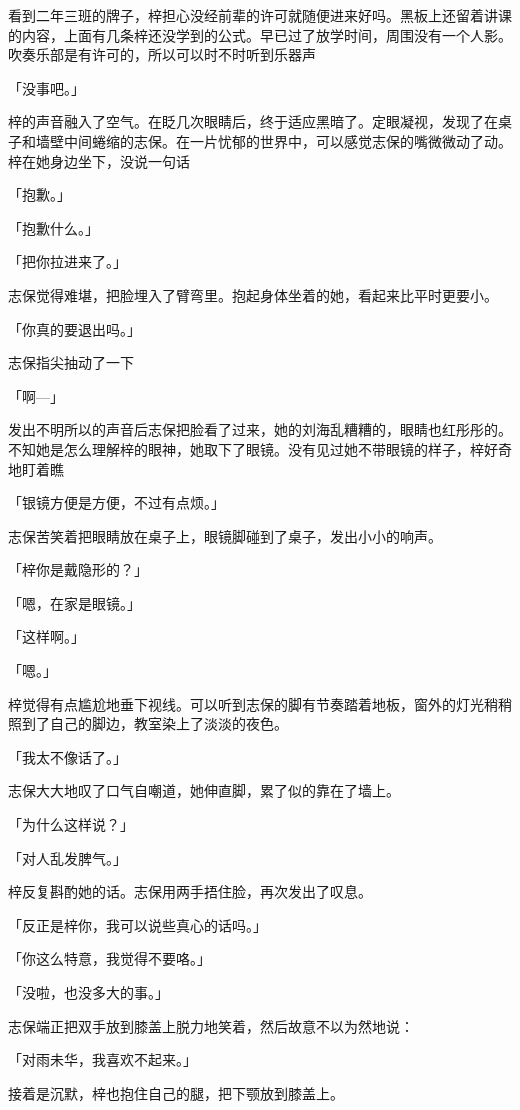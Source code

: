 \documentclass[UTF8]{ctexart}
\begin{document}
    看到二年三班的牌子，梓担心没经前辈的许可就随便进来好吗。黑板上还留着讲课的内容，上面有几条梓还没学到的公式。早已过了放学时间，周围没有一个人影。吹奏乐部是有许可的，所以可以时不时听到乐器声

    「没事吧。」

    梓的声音融入了空气。在眨几次眼睛后，终于适应黑暗了。定眼凝视，发现了在桌子和墙壁中间蜷缩的志保。在一片忧郁的世界中，可以感觉志保的嘴微微动了动。梓在她身边坐下，没说一句话

    「抱歉。」

    「抱歉什么。」

    「把你拉进来了。」

    志保觉得难堪，把脸埋入了臂弯里。抱起身体坐着的她，看起来比平时更要小。

    「你真的要退出吗。」

    志保指尖抽动了一下

    「啊—」

    发出不明所以的声音后志保把脸看了过来，她的刘海乱糟糟的，眼睛也红彤彤的。不知她是怎么理解梓的眼神，她取下了眼镜。没有见过她不带眼镜的样子，梓好奇地盯着瞧

    「银镜方便是方便，不过有点烦。」

    志保苦笑着把眼睛放在桌子上，眼镜脚碰到了桌子，发出小小的响声。

    「梓你是戴隐形的？」

    「嗯，在家是眼镜。」

    「这样啊。」

    「嗯。」

    梓觉得有点尴尬地垂下视线。可以听到志保的脚有节奏踏着地板，窗外的灯光稍稍照到了自己的脚边，教室染上了淡淡的夜色。

    「我太不像话了。」

    志保大大地叹了口气自嘲道，她伸直脚，累了似的靠在了墙上。

    「为什么这样说？」

    「对人乱发脾气。」

    梓反复斟酌她的话。志保用两手捂住脸，再次发出了叹息。

    「反正是梓你，我可以说些真心的话吗。」

    「你这么特意，我觉得不要咯。」

    「没啦，也没多大的事。」

    志保端正把双手放到膝盖上脱力地笑着，然后故意不以为然地说：

    「对雨未华，我喜欢不起来。」

    接着是沉默，梓也抱住自己的腿，把下颚放到膝盖上。
\end{document}
